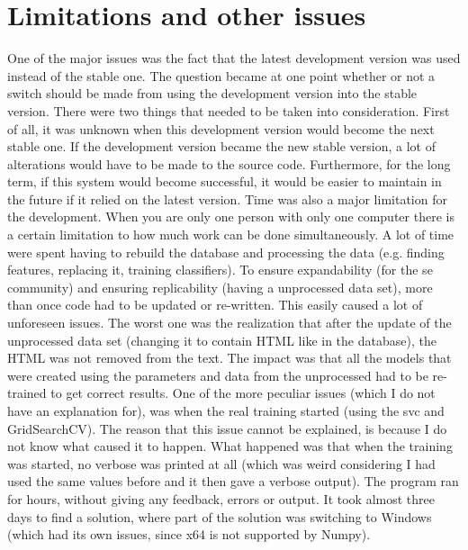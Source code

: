 \clearpage
\section{Limitations and other issues}
\label{sec:limitations_and_issues}
One of the major issues was the fact that the latest development version was used instead of the stable one.
The question became at one point whether or not a switch should be made from using the development version into the stable version.
There were two things that needed to be taken into consideration. 
First of all, it was unknown when this development version would become the next stable one.
If the development version became the new stable version, a lot of alterations would have to be made to the source code.
Furthermore, for the long term, if this system would become successful, it would be easier to maintain in the future if it relied on the latest version.
\vspace{0.5em}\newline
Time was also a major limitation for the development. 
When you are only one person with only one computer there is a certain limitation to how much work can be done simultaneously.
A lot of time were spent having to rebuild the database and processing the data (e.g. finding features, replacing it, training classifiers).
To ensure expandability (for the \gls{se} community) and ensuring replicability (having a unprocessed data set), more than once code had to be updated or re-written. 
This easily caused a lot of unforeseen issues.
The worst one was the realization that after the update of the unprocessed data set (changing it to contain HTML like in the database), the HTML was not removed from the text.
The impact was that all the models that were created using the parameters and data from the unprocessed had to be re-trained to get correct results. 
\vspace{0.5em}\newline
One of the more peculiar issues (which I do not have an explanation for), was when the real training started (using the \gls{svc} and GridSearchCV).
The reason that this issue cannot be explained, is because I do not know what caused it to happen.
What happened was that when the training was started, no verbose was printed at all (which was weird considering I had used the same values before and it then gave a verbose output). 
The program ran for hours, without giving any feedback, errors or output. 
\vspace{0.5em}\newline
It took almost three days to find a solution, where part of the solution was switching to Windows (which had its own issues, since x64 is not supported by Numpy).
